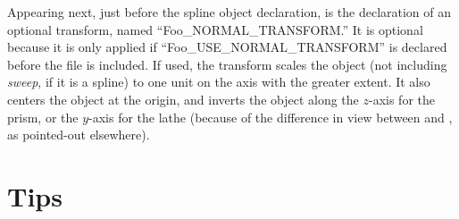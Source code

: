 	Appearing next, just before the spline object
	declaration, is the declaration of an optional transform,
	named ``Foo\_NORMAL\_TRANSFORM.''
	It is optional because it is only applied if
	``Foo\_USE\_NORMAL\_TRANSFORM'' is declared before the
	file is included. If used, the transform scales the
	object (not including \emph{sweep}, if it is a spline)
	to one unit on the axis with the greater extent. It also
	centers the object at the origin, and inverts the object
	along the $z$-axis for the prism,
	or the $y$-axis for the lathe (because of the difference in view
	between \IXpov{} and \IXpkg{}, as pointed-out elsewhere).


	\section{Tips}%


